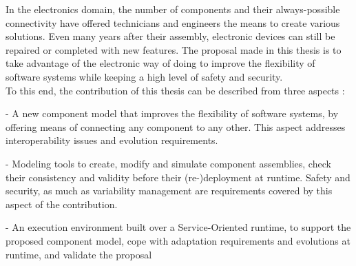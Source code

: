 In the electronics domain, the number of components and their always-possible connectivity have offered technicians and engineers the means to create various solutions. Even many years after their assembly, electronic devices can still be repaired or completed with new features. The proposal made in this thesis is to take advantage of the electronic way of doing to improve the flexibility of software systems while keeping a high level of safety and security.\\
To this end, the contribution of this thesis can be described from three aspects :
\par - A new component model that improves the flexibility of software systems, by offering means of connecting any component to any other. This aspect addresses interoperability issues and evolution requirements.
\par - Modeling tools to create, modify and simulate component assemblies, check their consistency and validity before their (re-)deployment at runtime. Safety and security, as much as variability management are requirements covered by this aspect of the contribution.
\par - An execution environment built over a Service-Oriented runtime, to support the proposed component model, cope with adaptation requirements and evolutions at runtime, and validate the proposal\\

